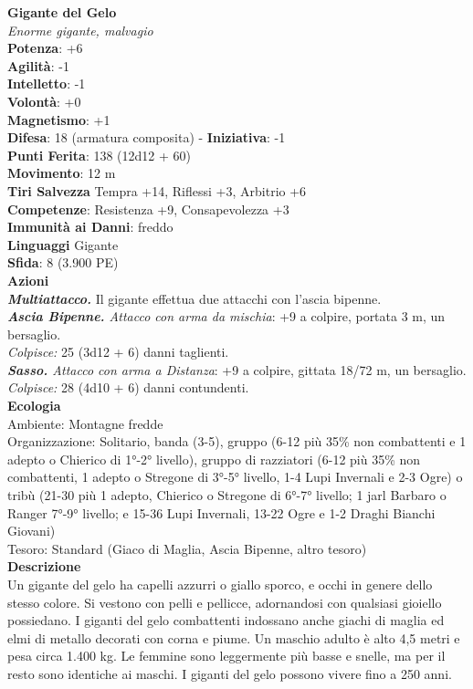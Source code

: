 \begin{multicols}{2}
\medskip\textbf{Gigante del Gelo}\\
\emph{Enorme gigante, malvagio}\\
\textbf{Potenza}: +6\\
\textbf{Agilità}: -1\\
\textbf{Intelletto}: -1\\
\textbf{Volontà}: +0\\
\textbf{Magnetismo}: +1\\
\textbf{Difesa}: 18 (armatura composita) - \textbf{Iniziativa}: -1\\
\textbf{Punti Ferita}: 138 (12d12 + 60)\\
\textbf{Movimento}: 12 m\\
\textbf{Tiri Salvezza} Tempra +14, Riflessi +3, Arbitrio +6\\
\textbf{Competenze}: Resistenza +9, Consapevolezza +3\\
\textbf{Immunità ai Danni}: freddo\\
\textbf{Linguaggi} Gigante\\
\textbf{Sfida}: 8 (3.900 PE)\smallskip\\
\smallskip\textbf{Azioni}\\
\emph{\textbf{Multiattacco.}} Il gigante effettua due attacchi con l'ascia bipenne.\\
\emph{\textbf{Ascia Bipenne.} Attacco con arma da mischia}: +9 a colpire, portata 3 m, un bersaglio.\\
\emph{Colpisce:} 25 (3d12 + 6) danni taglienti.\\
\emph{\textbf{Sasso.} Attacco con arma a Distanza}: +9 a colpire, gittata 18/72 m, un bersaglio.\\
\emph{Colpisce:} 28 (4d10 + 6) danni contundenti.\\
\textbf{Ecologia}\\
Ambiente: Montagne fredde\\
Organizzazione: Solitario, banda (3-5), gruppo (6-12 più 35\% non combattenti e 1 adepto o Chierico di 1°-2° livello), gruppo di razziatori (6-12 più 35\% non combattenti, 1 adepto o Stregone di 3°-5° livello, 1-4 Lupi Invernali e 2-3 Ogre) o tribù (21-30 più 1 adepto, Chierico o Stregone di 6°-7° livello; 1 jarl Barbaro o Ranger 7°-9° livello; e 15-36 Lupi Invernali, 13-22 Ogre e 1-2 Draghi Bianchi Giovani)\\
Tesoro: Standard (Giaco di Maglia, Ascia Bipenne, altro tesoro)\\
\textbf{Descrizione}\\
Un gigante del gelo ha capelli azzurri o giallo sporco, e occhi in genere dello stesso colore. Si vestono con pelli e pellicce, adornandosi con qualsiasi gioiello possiedano. I giganti del gelo combattenti indossano anche giachi di maglia ed elmi di metallo decorati con corna e piume. Un maschio adulto è alto 4,5 metri e pesa circa 1.400 kg. Le femmine sono leggermente più basse e snelle, ma per il resto sono identiche ai maschi. I giganti del gelo possono vivere fino a 250 anni.\\


\end{multicols}

